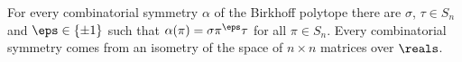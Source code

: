 \begin{introthm}\label{main:birkhoff_symgrp}
  For every combinatorial symmetry $\alpha$ of 
  the Birkhoff polytope 
  there are $\sigma$, $\tau\in S_n$ and $\eps\in \{\pm 1\}$
  such that $\alpha(\pi)= \sigma \pi^{\eps} \tau$
  for all $\pi\in S_n$.  
  Every combinatorial symmetry comes from an isometry of
  the space of $n\times n$ matrices over $\reals$.
\end{introthm}
